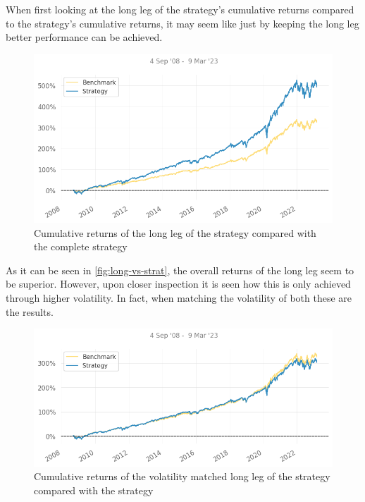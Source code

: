 When first looking at the long leg of the strategy's cumulative returns compared to the strategy's cumulative returns, it may seem like just by keeping the long leg better performance can be achieved.

\begin{figure}[ht]
    \captionsetup{justification=centering}
    \includegraphics[width=\linewidth]{assets/long-vs-strat.png}
    \caption{Cumulative returns of the long leg of the strategy compared with the complete strategy}
    \label{fig:long-vs-strat}
\end{figure}

As it can be seen in \autoref{fig:long-vs-strat}, the overall returns of the long leg seem to be superior. However, upon closer inspection it is seen how this is only achieved through higher volatility. In fact, when matching the volatility of both these are the results.
\newpage
\begin{figure}[ht]
    \captionsetup{justification=centering}
    \includegraphics[width=\linewidth]{assets/long-vs-strat-vol-matched.png}
    \caption{Cumulative returns of the volatility matched long leg of the strategy compared with the strategy}
    \label{fig:long-vs-strat-vol-matched}
\end{figure}

